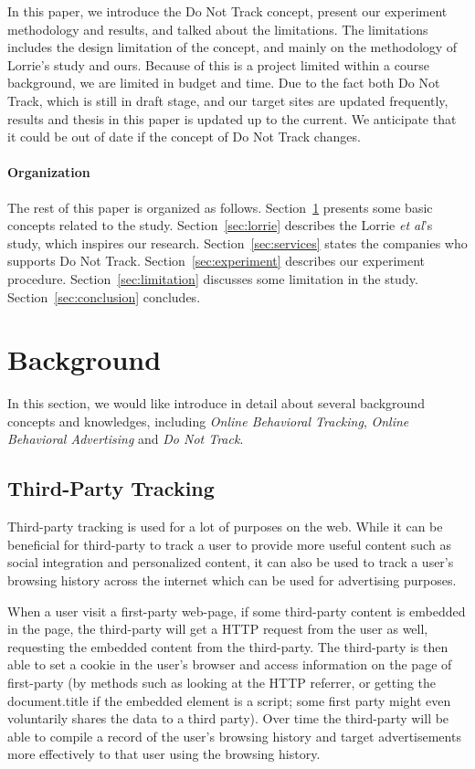 \documentclass{sig-alternate}
\begin{document}
In this paper, we introduce the Do Not Track concept, present our experiment methodology and results, and talked about the limitations. The limitations includes the design limitation of the concept, and mainly on the methodology of Lorrie's study and ours. Because of this is a project limited within a course background, we are limited in budget and time. Due to the fact both Do Not Track, which is still in draft stage, and our target sites are updated frequently, results and thesis in this paper is updated up to the current. We anticipate that it could be out of date if the concept of Do Not Track changes.

\paragraph{Organization}
The rest of this paper is organized as follows. Section~\ref{sec:background} presents some basic concepts related to the study.  Section~\ref{sec:lorrie} describes the Lorrie \emph{et al}'s study, which inspires our research. Section~\ref{sec:services} states the companies who supports Do Not Track. Section~\ref{sec:experiment} describes our experiment procedure. Section~\ref{sec:limitation} discusses some limitation in the study. Section~\ref{sec:conclusion} concludes.

\section{Background} \label{sec:background}

In this section, we would like introduce in detail about several background concepts and knowledges, including \emph{Online Behavioral Tracking}, \emph{Online Behavioral Advertising} and \emph{Do Not Track}. 
\subsection*{Third-Party Tracking}

Third-party tracking is used for a lot of purposes on the web. While it can be beneficial for third-party to track a user to provide more useful content such as social integration and personalized content, it can also be used to track a user's browsing history across the internet which can be used for advertising purposes. 

When a user visit a first-party web-page, if some third-party content is embedded in the page, the third-party will get a HTTP request from the user as well, requesting the embedded content from the third-party. The third-party is then able to set a cookie in the user’s browser and access information on the page of first-party (by methods such as looking at the HTTP referrer, or getting the document.title if the embedded element is a script; some first party might even voluntarily shares the data to a third party). Over time the third-party will be able to compile a record of the user's browsing history and target advertisements more effectively to that user using the browsing history.
\end{document}
